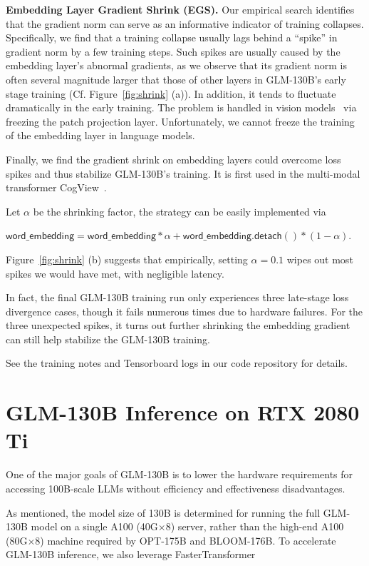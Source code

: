 \textbf{Embedding Layer Gradient Shrink (EGS).} Our empirical search identifies that the gradient norm can serve as an informative indicator of training collapses. Specifically, we find that a training collapse usually lags behind a ``spike'' in gradient norm by a few training steps. Such spikes are usually caused by the embedding layer's abnormal gradients, as we observe that its gradient norm is often several magnitude larger that those of other layers in GLM-130B's early stage training (Cf. Figure~\ref{fig:shrink} (a)). In addition, it tends to fluctuate dramatically in the early training. The problem is handled in vision models~\citep{chen2021empirical} via freezing the patch projection layer. Unfortunately, we cannot freeze the training of the embedding layer in language models.

Finally, we find the gradient shrink on embedding layers could overcome loss spikes and thus stabilize GLM-130B's training. It is first used in the multi-modal transformer CogView~\citep{ding2021cogview}. 

Let $\alpha$ be the shrinking factor, the strategy can be easily implemented via

  $  \mathsf{word\_embedding} = \mathsf{word\_embedding} * \alpha + \mathsf{word\_embedding.detach()} * (1 - \alpha)$. 

Figure~\ref{fig:shrink} (b) suggests that empirically, setting $\alpha=0.1$ wipes out most spikes we would have met, with negligible latency. 

In fact, the final GLM-130B training run only experiences three late-stage loss divergence cases, though it fails numerous times due to hardware failures. For the three unexpected spikes, it turns out further shrinking the embedding gradient can still help stabilize the GLM-130B training. 

See the training notes and Tensorboard logs in our code repository for details. 

\section{GLM-130B Inference on RTX 2080 Ti}

One of the major goals of GLM-130B is to lower the hardware requirements for accessing 100B-scale LLMs without efficiency and effectiveness disadvantages. 

As mentioned, the model size of 130B is determined for running the full GLM-130B model on a single A100 (40G$\times$8) server, rather than the high-end A100 (80G$\times$8) machine required by OPT-175B and BLOOM-176B. To accelerate GLM-130B inference, we also leverage FasterTransformer~\citep{timonin2022accelerated}

